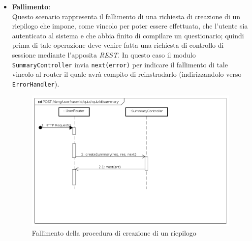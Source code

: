 \begin{itemize}
\item \textbf{Fallimento}:\\
Questo scenario rappresenta il fallimento di una richiesta di creazione di un riepilogo che impone, come vincolo per poter essere effettuata, che l'utente sia autenticato al sistema e che abbia finito di compilare un questionario; quindi prima di tale operazione deve venire fatta una richiesta di controllo di sessione mediante l'apposita \textit{REST}. In questo caso il modulo \texttt{SummaryController} invia \texttt{next(error)} per indicare il fallimento di tale vincolo al router il quale avrà compito di reinstradarlo (indirizzandolo verso \texttt{ErrorHandler}).
\label{Fallimento della procedura di creazione di un riepilogo}
\begin{figure}[ht]
	\centering
	\includegraphics[scale=0.40]{UML/DiagrammiDiSequenza/Back-end/POST__lang_user_userId_quiz_quizId_summary_failure.png}
	\caption{Fallimento della procedura di creazione di un riepilogo}
\end{figure}
\FloatBarrier
\end{itemize}

